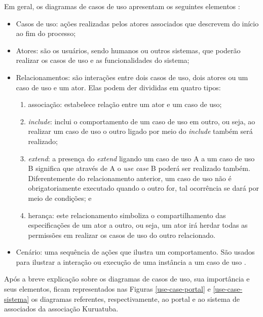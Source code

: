 Em geral, os diagramas de casos de uso apresentam os seguintes elementos \cite{zapata2007conversion}:

\begin{itemize}
 \item Casos de uso: ações realizadas pelos atores associados que descrevem do início ao fim do processo;
 \item Atores: são os usuários, sendo humanos ou outros sistemas, que poderão realizar os casos de uso e as funcionalidades do sistema;
 \item Relacionamentos: são interações entre dois casos de uso, dois atores ou um caso de uso e um ator. Elas podem der divididas em quatro tipos:
 
 \begin{enumerate}
  \item associação: estabelece relação entre um ator e um caso de uso;
  \item \textit{include}: inclui o comportamento de um caso de uso em outro, ou seja, ao realizar um caso de uso o outro ligado por meio do \textit{include} também será realizado;
  \item \textit{extend}: a presença do \textit{extend} ligando um caso de uso A a um caso de uso B significa que através de A o \textit{use case} B poderá ser realizado também. Diferentemente do relacionamento anterior, um caso de uso não é obrigatoriamente executado quando o outro for, tal ocorrência se dará por meio de condições; e
  \item herança: este relacionamento simboliza o compartilhamento das especificações de um ator a outro, ou seja, um ator irá herdar todas as permissões em realizar os casos de uso do outro relacionado.
 \end{enumerate}
 
\item Cenário: uma sequência de ações que ilustra um comportamento. São usados para ilustrar a interação ou execução de uma instância a um caso de uso \cite[~p. 239, tradução nossa]{zapata2007conversion}. 

\end{itemize}

Após a breve explicação sobre os diagramas de casos de uso, sua importância e seus elementos, ficam representados nas Figuras \ref{use-case-portal} e \ref{use-case-sistema} os diagramas referentes, respectivamente, ao portal e ao sistema de associados da associação Kuruatuba.


